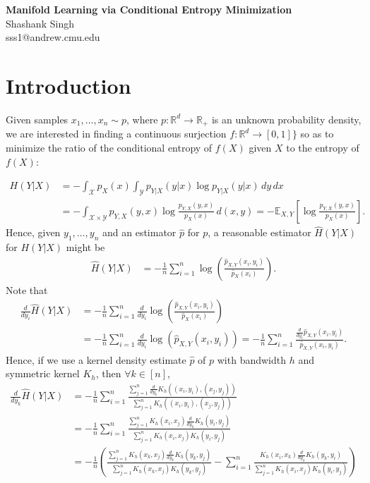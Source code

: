 \documentclass{article}
\newcommand{\R}{\mathbb{R}}                         %
\newcommand{\X}{\mathcal{X}}                        %
\newcommand{\Y}{\mathcal{Y}}                        %
\newcommand{\E}{\mathbb{E}}                         %
\begin{document}
\begin{center}
{\bf\Large Manifold Learning via Conditional Entropy Minimization}\\
Shashank Singh\\
sss1@andrew.cmu.edu\\
\end{center}

\section{Introduction}
Given samples $x_1,\dots,x_n \sim p$, where $p : \R^d \to \R_+$ is an unknown
probability density, we are interested in finding a continuous surjection
$f : \R^d \to [0,1]\}$ so as to minimize the ratio of the conditional entropy
of $f(X)$ given $X$ to the entropy of $f(X)$:

\begin{align*}
H(Y|X)
 &  = -\int_\X p_X(x) \int_\Y p_{Y|X}(y|x) \log p_{Y|X}(y|x) \, dy \, dx \\
 &  = -\int_{\X \times \Y} p_{Y,X}(y,x) \log \frac{p_{Y,X}(y,x)}{p_X(x)} \, d(x,y)
    = -\E_{X,Y} \left[ \log \frac{p_{Y,X}(y,x)}{p_X(x)} \right].
\end{align*}
Hence, given $y_1,\dots,y_n$ and an estimator $\hat p$ for $p$, a reasonable
estimator $\hat H(Y|X)$ for $H(Y|X)$ might be 
\begin{align*}
\hat H(Y|X)
 &  = - \frac{1}{n} \sum_{i = 1}^n
            \log \left( \frac{\hat p_{X,Y}(x_i,y_i)}{\hat p_X(x_i)} \right).
\end{align*}
Note that
\begin{align*}
\frac{d}{dy_i} \hat H(Y|X)
 &  = - \frac{1}{n} \sum_{i = 1}^n \frac{d}{dy_i}
        \log \left( \frac{\hat p_{X,Y}(x_i,y_i)}{\hat p_X(x_i)} \right) \\
 &  = - \frac{1}{n} \sum_{i = 1}^n \frac{d}{dy_i}
        \log \left( \hat p_{X,Y}(x_i,y_i) \right)
    = - \frac{1}{n} \sum_{i = 1}^n
            \frac{\frac{d}{dy_i} \hat p_{X,Y}(x_i,y_i)}{\hat p_{X,Y}(x_i,y_i)}.
\end{align*}
Hence, if we use a kernel density estimate $\hat p$ of $p$ with bandwidth $h$
and symmetric kernel $K_h$, then $\forall k \in [n]$,
\begin{align*}
\frac{d}{dy_k} \hat H(Y|X)
 &  = - \frac{1}{n} \sum_{i = 1}^n
            \frac{\sum_{j = 1}^n
            \frac{d}{dy_k} K_h((x_i,y_i),(x_j,y_j))}
            {\sum_{j = 1}^n K_h((x_i,y_i),(x_j,y_j))}  \\
 &  = - \frac{1}{n} \sum_{i = 1}^n
            \frac{\sum_{j = 1}^n
            K_h(x_i,x_j) \frac{d}{dy_k} K_h(y_i,y_j)}
            {\sum_{j = 1}^n K_h(x_i,x_j)K_h(y_i,y_j)}  \\
 &  = - \frac{1}{n} \left(
            \frac{\sum_{j = 1}^n K_h(x_k,x_j)\frac{d}{dy_k} K_h(y_k,y_j)}
            {\sum_{j = 1}^n K_h(x_k,x_j)K_h(y_k,y_j)}
    - \sum_{i = 1}^n
            \frac{K_h(x_i,x_k)\frac{d}{dy_k} K_h(y_k,y_i)}
            {\sum_{j = 1}^n K_h(x_i,x_j)K_h(y_i,y_j)}
        \right)
\end{align*}
\end{document}
